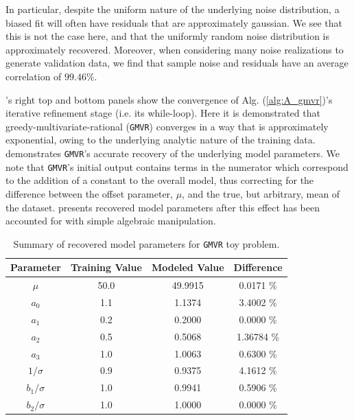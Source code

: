 \documentclass[twocolumn,aps,prd,floatfix,preprintnumbers,a4paper,nofootinbib,
superscriptaddress,10pt]{revtex4-1}
\def\gmvr#1{greedy-multivariate-rational#1
  (\texttt{GMVR}#1)\gdef\gmvr{\texttt{GMVR}}}
\begin{document}
%
In particular, despite the uniform nature of the underlying noise distribution, a biased fit will often have residuals that are approximately gaussian.
%
We see that this is not the case here, and that the uniformly random noise distribution is approximately recovered.
%
Moreover, when considering many noise realizations to generate validation data, we find that sample noise and residuals have an average correlation of $99.46\%$.
%
\par {}'s right top and bottom panels show the convergence of Alg. (\ref{alg:A_gmvr})'s iterative refinement stage (i.e. its while-loop).
%
Here it is demonstrated that \gmvr{} converges in a way that is approximately exponential, owing to the underlying analytic nature of the training data.
%
 demonstrates \gmvr{}'s accurate recovery of the underlying model parameters.
%
We note that \gmvr{}'s initial output contains terms in the numerator which correspond to the addition of a constant to the overall model, thus correcting for the difference between the offset parameter, $\mu$, and the true, but arbitrary, mean of the dataset.
%
 presents recovered model parameters after this effect has been accounted for with simple algebraic manipulation.
%
%
%
\begin{table}
  \caption{Summary of recovered model parameters for \gmvr{} toy problem.}
  \label{tb:gmvrtoy}
  \begin{tabular}{|c|c|c|c|}
    \hline
    \hline
    Parameter & Training Value & Modeled Value & Difference \\ \hline \hline
    $\mu$ & 50.0 & 49.9915 & 0.0171 \% \\ \hline
    $a_0$ & 1.1 & 1.1374 & 3.4002 \% \\ \hline
    $a_1$ & 0.2 & 0.2000 & 0.0000 \% \\ \hline
    $a_2$ & 0.5 & 0.5068 & 1.36784 \% \\ \hline
    $a_3$ & 1.0 & 1.0063 & 0.6300 \% \\ \hline
    $1/\sigma$ & 0.9 & 0.9375 & 4.1612 \% \\ \hline
    $b_1/\sigma$ & 1.0 & 0.9941 & 0.5906 \% \\ \hline
    $b_2/\sigma$ & 1.0 & 1.0000 & 0.0000 \% \\ \hline
    \hline
  \end{tabular}

\end{table}
\end{document}
